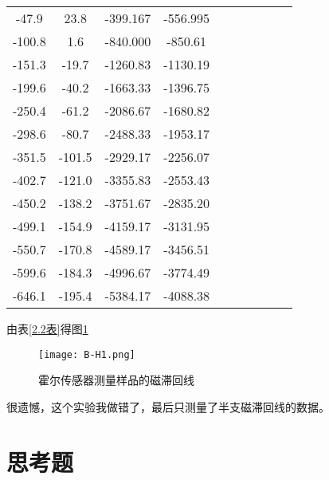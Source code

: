 \documentclass[11pt]{article}
\begin{document}
\begin{table}[H]
\begin{tabular}{cccccccccc}
			-47.9    & 23.8    & -399.167                       & -556.995                                 \\
			-100.8   & 1.6     & -840.000                       & -850.61                                  \\
			-151.3   & -19.7   & -1260.83                       & -1130.19                                 \\
			-199.6   & -40.2   & -1663.33                       & -1396.75                                 \\
			-250.4   & -61.2   & -2086.67                       & -1680.82                                 \\
			-298.6   & -80.7   & -2488.33                       & -1953.17                                 \\
			-351.5   & -101.5  & -2929.17                       & -2256.07                                 \\
			-402.7   & -121.0  & -3355.83                       & -2553.43                                 \\
			-450.2   & -138.2  & -3751.67                       & -2835.20                                 \\
			-499.1   & -154.9  & -4159.17                       & -3131.95                                 \\
			-550.7   & -170.8  & -4589.17                       & -3456.51                                 \\
			-599.6   & -184.3  & -4996.67                       & -3774.49                                 \\
			-646.1   & -195.4  & -5384.17                       & -4088.38                                 \\
			\bottomrule
		\end{tabular}
	\end{table}
	由表\ref{2.2表}得图\ref{fig:B-H1}
	
	\begin{figure}[H]
		\centering
		\texttt{[image: B-H1.png]}
		\caption{霍尔传感器测量样品的磁滞回线}
		\label{fig:B-H1}
	\end{figure}
	很遗憾，这个实验我做错了，最后只测量了半支磁滞回线的数据。
	
	\section{思考题}
	
\end{document}
